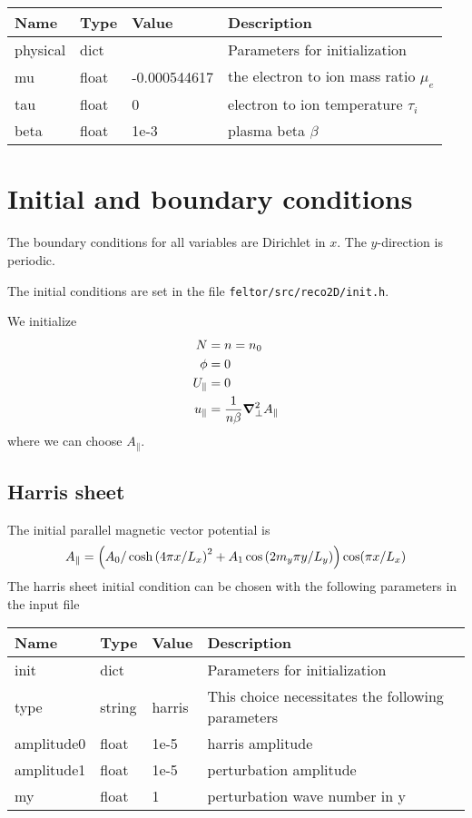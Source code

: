 \begin{longtable}{llll}
\toprule
\rowcolor{gray!50}\textbf{Name} &  \textbf{Type} & \textbf{Value}  & \textbf{Description}  \\ \midrule
physical &  dict &   & Parameters for initialization \\
\qquad mu      & float & -0.000544617 & the electron to ion mass ratio $\mu_e$ \\
\qquad tau  & float &  0    &  electron to ion temperature $\tau_i$ \\
\qquad beta  & float &  1e-3    &  plasma beta $\beta$ \\
\bottomrule
\end{longtable}

\section{Initial and boundary conditions}
The boundary conditions for all variables are Dirichlet in $x$.
The $y$-direction is periodic.

The initial conditions are set in the file \texttt{feltor/src/reco2D/init.h}.

We initialize
\begin{align}
 N&=n =n_0 \\
 \phi &= 0 \\
  U_\parallel&=0 \\
  u_\parallel &= \frac{1}{n  \beta }{\boldsymbol{\nabla}}^2_{\perp} A_\parallel
\end{align}
where we can choose $A_\parallel$.
\subsection{Harris sheet}
The initial parallel magnetic vector potential is
\begin{align}
    A_\parallel =\left( A_0 / \cosh{( 4  \pi x / L_x )}^2 +A_1\cos{(2 m_y\pi y/L_y)}\right) \cos( \pi x /L_x)
\end{align}
The harris sheet initial condition can be chosen with the following parameters in the input file
\begin{longtable}{llll}
\toprule
\rowcolor{gray!50}\textbf{Name} &  \textbf{Type} & \textbf{Value}  & \textbf{Description}  \\ \midrule
init &  dict &   & Parameters for initialization \\
\qquad type      & string & harris & This choice necessitates the following parameters \\
\qquad amplitude0  & float &  1e-5    &  harris amplitude \\
\qquad amplitude1  & float &  1e-5    &  perturbation amplitude \\
\qquad my          & float &  1       &  perturbation wave number in y\\
\bottomrule
\end{longtable}
